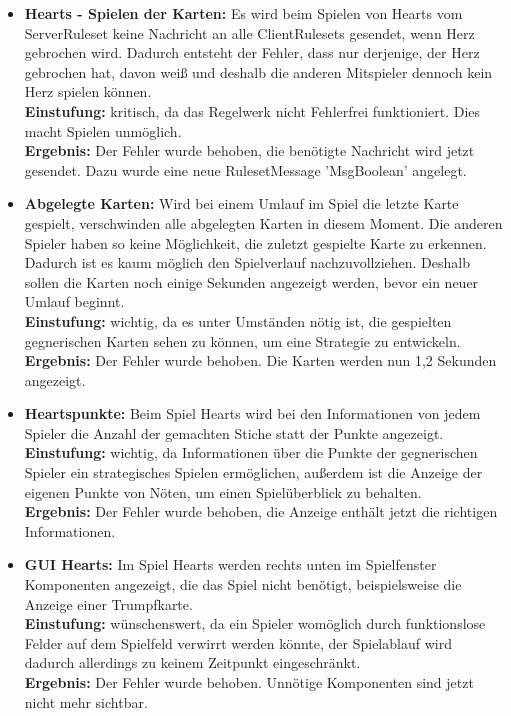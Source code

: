 \documentclass[a4paper]{article}
\begin{document}
	\begin{itemize}
	\item \textbf{Hearts - Spielen der Karten:} Es wird beim Spielen von Hearts vom ServerRuleset keine Nachricht an 		alle ClientRulesets gesendet, wenn Herz gebrochen wird. Dadurch entsteht der Fehler, dass nur derjenige, der Herz 			gebrochen hat, davon weiß und deshalb die anderen Mitspieler dennoch kein Herz spielen können. \\
	\textbf{Einstufung:} kritisch, da das Regelwerk nicht Fehlerfrei funktioniert. Dies macht Spielen unmöglich.\\
	\textbf{Ergebnis:} Der Fehler wurde behoben, die benötigte Nachricht wird jetzt gesendet. Dazu wurde eine neue RulesetMessage 'MsgBoolean' angelegt.\\
	
	\item \textbf{Abgelegte Karten:} Wird bei einem Umlauf im Spiel die letzte Karte gespielt, verschwinden alle abgelegten Karten in diesem Moment. Die anderen Spieler haben so keine Möglichkeit, die zuletzt gespielte Karte zu erkennen. Dadurch ist es 			kaum möglich den Spielverlauf nachzuvollziehen. Deshalb sollen die Karten noch einige Sekunden angezeigt werden, bevor ein neuer Umlauf beginnt. \\
	\textbf{Einstufung:} wichtig, da es unter Umständen nötig ist, die gespielten gegnerischen Karten sehen zu können, um eine Strategie zu entwickeln. \\
	\textbf{Ergebnis:} Der Fehler wurde behoben. Die Karten werden nun 1,2 Sekunden angezeigt.\\
	
	\item \textbf{Heartspunkte:} Beim Spiel Hearts wird bei den Informationen von jedem Spieler die Anzahl der gemachten 			Stiche statt der Punkte angezeigt. \\
	\textbf{Einstufung:} wichtig, da Informationen über die Punkte der gegnerischen Spieler ein strategisches Spielen ermöglichen, außerdem ist die Anzeige der eigenen Punkte von Nöten, um einen Spielüberblick zu behalten.\\
	\textbf{Ergebnis:} Der Fehler wurde behoben, die Anzeige enthält jetzt die richtigen Informationen.

	\item \textbf{GUI Hearts:} Im Spiel Hearts werden rechts unten im Spielfenster Komponenten angezeigt, die das Spiel 			nicht benötigt, beispielsweise die Anzeige einer Trumpfkarte. \\
	\textbf{Einstufung:} wünschenswert, da ein Spieler womöglich durch funktionslose Felder auf dem Spielfeld verwirrt werden könnte, der Spielablauf wird dadurch allerdings zu keinem Zeitpunkt eingeschränkt.\\
	\textbf{Ergebnis:} Der Fehler wurde behoben. Unnötige Komponenten sind jetzt nicht mehr sichtbar.\\
	

\end{itemize}
\end{document}
